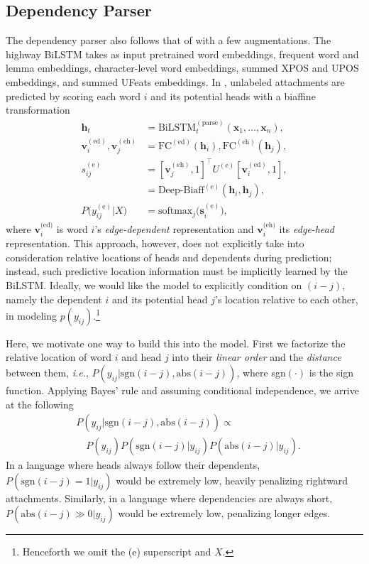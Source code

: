 \documentclass[11pt,a4paper]{article}
\begin{document}
\subsection{Dependency Parser}
The dependency parser also follows that of \cite{dozat-qi-manning:2017:K17-3} with a few augmentations. The highway BiLSTM takes as input pretrained word embeddings, frequent word and lemma embeddings, character-level word embeddings, summed XPOS and UPOS embeddings, and summed UFeats embeddings. In \cite{dozat-qi-manning:2017:K17-3}, unlabeled attachments are predicted by scoring each word $i$ and its potential heads with a biaffine transformation
\begin{align}
  \mathbf{h}_t &= \text{BiLSTM}_t^{(\text{parse})}(\mathbf{x}_1, \ldots, \mathbf{x}_n) , \label{eqn:dbs-1} \\
  \mathbf{v}^{(\text{ed})}_i, \mathbf{v}^{(\text{eh})}_j &= \text{FC}^{(\text{ed})}(\mathbf{h}_i), \text{FC}^{(\text{eh})}(\mathbf{h}_j) ,\\
  s^{(\text{e})}_{ij} &= [\mathbf{v}_j^{(\text{eh})}, 1]^\top U^{(\text{e})}[\mathbf{v}^{(\text{ed})}_i, 1] ,\\
  &= \text{Deep-Biaff}^{(\text{e})}(\mathbf{h}_i, \mathbf{h}_j) , \label{eqn:dbs-3}\\
  P\big(y_{ij}^{(\text{e})}| X\big) &= \text{softmax}_j\big(\mathbf{s}^{(\text{e})}_i\big) ,\label{eqn:Pyij}
\end{align}
where $\mathbf{v}_i^{\textrm{(ed)}}$ is word $i$'s \emph{edge-dependent} representation and $\mathbf{v}_i^{\textrm{(eh)}}$ its \emph{edge-head} representation.
This approach, however, does not explicitly take into consideration relative locations of heads and dependents during prediction; instead, such predictive location information must be implicitly learned by the BiLSTM. Ideally, we would like the model to explicitly condition on $(i-j)$, namely the dependent $i$ and its potential head $j$'s location relative to each other, in modeling $p(y_{ij})$.\footnote{Henceforth we omit the (e) superscript and $X$.}


Here, we motivate one way to build this into the model. First we factorize the relative location of word $i$ and head $j$ into their \emph{linear order} and the \emph{distance} between them, \emph{i.e.}, $P(y_{ij} | \text{sgn}(i - j), \text{abs}(i - j))$, where sgn$(\cdot)$ is the sign function. Applying Bayes' rule and assuming conditional independence, we arrive at the following
\begin{align}
  \label{lin-dist}&P(y_{ij} | \text{sgn}(i-j),\text{abs}(i-j))\propto\\
  &\quad P(y_{ij})P(\text{sgn}(i-j) | y_{ij})P(\text{abs}(i-j) | y_{ij})\nonumber .
\end{align}
In a language where heads always follow their dependents, $P(\text{sgn}(i-j) = 1 | y_{ij})$ would be extremely low, heavily penalizing rightward attachments. Similarly, in a language where dependencies are always short, $P(\text{abs}(i-j) \gg 0 | y_{ij})$ would be extremely low, penalizing longer edges.
\end{document}
